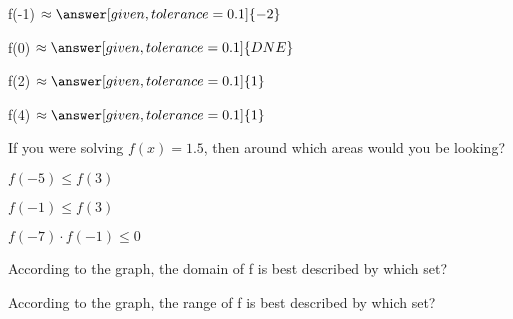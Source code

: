 \documentclass{ximera}
\begin{document}
\begin{exercise}
f(-1)   $\approx \answer[given,tolerance=0.1]{-2}$
\end{exercise}


\begin{exercise}
f(0)   $\approx \answer[given,tolerance=0.1]{DNE}$
\end{exercise}


\begin{exercise}
f(2)   $\approx \answer[given,tolerance=0.1]{1}$
\end{exercise}


\begin{exercise}
f(4)   $\approx \answer[given,tolerance=0.1]{1}$
\end{exercise}



\begin{exercise}
If you were solving $f(x) = 1.5$, then around which areas would you be looking?
\begin{selectAll}
\end{selectAll}
\end{exercise}



\begin{exercise}
$f(-5) \leq f(3)$
\begin{multipleChoice}
\end{multipleChoice}
\end{exercise}



\begin{exercise}
$f(-1) \leq f(3)$
\begin{multipleChoice}
\end{multipleChoice}
\end{exercise}


\begin{exercise}
$f(-7) \cdot f(-1) \leq 0$
\begin{multipleChoice}
\end{multipleChoice}
\end{exercise}




\begin{exercise}
According to the graph, the domain of f is best described by which set?
\begin{multipleChoice}
\choice[correct]{$(-\infty, -1] \cup (1, \infty)$}
\choice{$(-3.5, -1] \cup (1, 3.5)$}
\choice{$(-3.5, -1] \cup (1, \infty)$}
\end{multipleChoice}
\end{exercise}

\begin{exercise}
According to the graph, the range of f is best described by which set?
\begin{multipleChoice}
\choice{$(-\infty, \infty)$}
\choice{$(-\infty, 2.5]$}
\end{multipleChoice}
\end{exercise}
\end{document}
